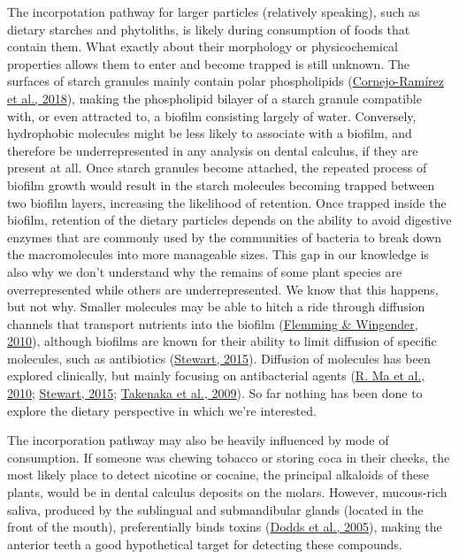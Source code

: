 \documentclass[
  letterpaper,
]{book}
\begin{document}
The incorpotation pathway for larger particles (relatively speaking),
such as dietary starches and phytoliths, is likely during consumption of
foods that contain them. What exactly about their morphology or
physicochemical properties allows them to enter and become trapped is
still unknown. The surfaces of starch granules mainly contain polar
phospholipids
(\protect\hyperlink{ref-cornejo-ramirezStructuralCharacteristics2018}{Cornejo-Ramírez
et al., 2018}), making the phospholipid bilayer of a starch granule
compatible with, or even attracted to, a biofilm consisting largely of
water. Conversely, hydrophobic molecules might be less likely to
associate with a biofilm, and therefore be underrepresented in any
analysis on dental calculus, if they are present at all. Once starch
granules become attached, the repeated process of biofilm growth would
result in the starch molecules becoming trapped between two biofilm
layers, increasing the likelihood of retention. Once trapped inside the
biofilm, retention of the dietary particles depends on the ability to
avoid digestive enzymes that are commonly used by the communities of
bacteria to break down the macromolecules into more manageable sizes.
This gap in our knowledge is also why we don't understand why the
remains of some plant species are overrepresented while others are
underrepresented. We know that this happens, but not why. Smaller
molecules may be able to hitch a ride through diffusion channels that
transport nutrients into the biofilm
(\protect\hyperlink{ref-flemmingBiofilmMatrix2010}{Flemming \&
Wingender, 2010}), although biofilms are known for their ability to
limit diffusion of specific molecules, such as antibiotics
(\protect\hyperlink{ref-stewartAntimicrobialTolerance2015}{Stewart,
2015}). Diffusion of molecules has been explored clinically, but mainly
focusing on antibacterial agents
(\protect\hyperlink{ref-maModelingDiffusion2010}{R. Ma et al., 2010};
\protect\hyperlink{ref-stewartAntimicrobialTolerance2015}{Stewart,
2015};
\protect\hyperlink{ref-takenakaDiffusionMacromolecules2009}{Takenaka et
al., 2009}). So far nothing has been done to explore the dietary
perspective in which we're interested.

The incorporation pathway may also be heavily influenced by mode of
consumption. If someone was chewing tobacco or storing coca in their
cheeks, the most likely place to detect nicotine or cocaine, the
principal alkaloids of these plants, would be in dental calculus
deposits on the molars. However, mucous-rich saliva, produced by the
sublingual and submandibular glands (located in the front of the mouth),
preferentially binds toxins
(\protect\hyperlink{ref-doddsHealthBenefits2005}{Dodds et al., 2005}),
making the anterior teeth a good hypothetical target for detecting these
compounds.
\end{document}
